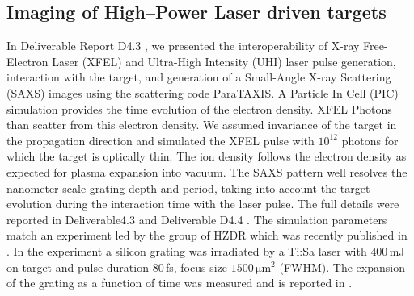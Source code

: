 \documentclass[10pt]{scrartcl}
\begin{document}
\subsection{Imaging of High--Power Laser driven targets\label{sec:high_power_imaging}}
In Deliverable Report D4.3 \cite{Fortmann-Grote2017e}, we presented the interoperability
of X-ray Free-Electron Laser (XFEL) and Ultra-High Intensity (UHI) laser pulse
generation, interaction with the target, and generation of a Small-Angle X-ray
Scattering (SAXS) images using the scattering code ParaTAXIS.  A Particle In
Cell (PIC) simulation provides the time evolution of the electron density. XFEL
Photons than scatter from this electron density.
We assumed invariance of the target in
the propagation direction and simulated the XFEL pulse with $10^{12}$ photons for
which the target is optically thin.  The ion density follows the electron
density as expected for plasma expansion into vacuum.  The SAXS pattern well
resolves the nanometer-scale grating depth and period, taking into account the
target evolution during the interaction time with the laser pulse.  The full
details were reported in Deliverable4.3 \cite{Fortmann-Grote2017e} and
Deliverable D4.4 \cite{Fortmann-Grote2017h}. The simulation
parameters match an experiment led by the group of HZDR which was recently
published in \cite{Kluge2018a}.  In the experiment a silicon grating was irradiated by a
Ti:Sa laser with $400$\,mJ on target and pulse duration $80$\,fs, focus size
$1500\,\mathrm{\mu m^2}$ (FWHM).  The expansion of the grating as a function of
time was measured and is reported in \cite{Kluge2018a}.
%
\end{document}
